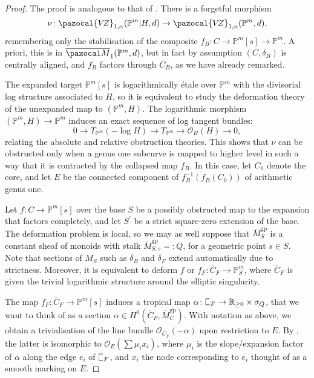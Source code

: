 \documentclass[11pt]{amsart}
\newcommand{\plC}{\scalebox{0.8}[1.3]{$\sqsubset$}}
\newcommand{\PP}{\mathbb P}
\newcommand{\VZ}{\pazocal{V\!Z}}
\newcommand{\OO}{\mathcal{O}}
\renewcommand{\to}{\rightarrow}
\newcommand{\RR}{\mathbb{R}}
\theoremstyle{definition}
\theoremstyle{definition}
\begin{document}
\begin{proof}
The proof is analogous to that of \cite[Theorem 3.5.1]{RSPW2}. There is a forgetful morphism
\[
\nu\colon \VZ_{1,\alpha}(\mathbb P^m|H,d)\to \VZ_{1,n}(\mathbb P^m,d),
\]
remembering only the stabilisation of the composite $f_B\colon C\to\PP^m[s]\to\PP^m$. A priori, this is in $\overline{\pazocal M}_1(\PP^m,d)$, but in fact by assumption $(C,\delta_B)$ is centrally aligned, and $f_B$ factors through $\overline C_B$, as we have already remarked.

The expanded target $\PP^m[s]$ is logarithmically \'etale over $\PP^m$ with the divisorial log structure associated to $H$, so it is equivalent to study the deformation theory of the unexpanded map to $(\PP^m,H)$. The logarithmic morphism $(\PP^m,H)\to \PP^m$ induces an exact sequence of log tangent bundles:
\[0\to T_{\PP^m}(-\operatorname{log}H)\to T_{\PP^m}\to\OO_H(H)\to 0,\]
relating the absolute and relative obstruction theories. This shows that $\nu$ can be obstructed only when a genus one subcurve is mapped to higher level in such a way that it is contracted by the collapsed map $f_B$. In this case, let $C_0$ denote the core, and let $E$ be the connected component of $f_B^{-1}(f_B(C_0))$ of arithmetic genus one.

Let $f\colon C\to\PP^m[s]$ over the base $S$ be a possibly obstructed map to the expansion that factors completely, and let $S^\prime$ be a strict square-zero extension of the base.  The deformation problem is local, so we may as well suppose that $\overline M_S^{\text{gp}}$ is a constant sheaf of monoids with stalk $\overline M_{S,s}^{\text{gp}}=:Q$, for a geometric point $s\in S$. Note that sections of $M_S$ such as $\delta_B$ and $\delta_F$ extend automatically due to strictness. Moreover, it is equivalent to deform $f$ or $f_F\colon\overline C_F\to\PP^m_S$, where $\overline C_F$ is given the trivial logarithmic structure around the elliptic singularity.

The map $f_F\colon \overline C_F\to\PP^m[s]$ induces a tropical map $\alpha\colon\plC_F\to\RR_{\geq 0}\times\sigma_Q$, that we want to think of as a section $\alpha\in H^0(\overline C_F,\overline M_C^{\text{gp}})$. With notation as above, we obtain a trivialisation of the line bundle $\OO_{\overline C_F}(-\alpha)$ upon restriction to $E$. By \cite[Proposition 2.4.1]{RSPW}, the latter is isomorphic to $\OO_E(\sum\mu_i x_i)$, where $\mu_i$ is the slope/expansion factor of $\alpha$ along the edge $e_i$ of $\plC_F$, and $x_i$ the node corresponding to $e_i$ thought of as a smooth marking on $E$. 


\end{proof}
\end{document}
